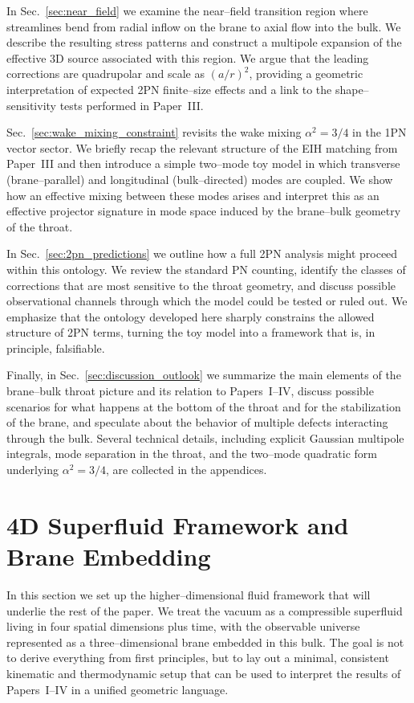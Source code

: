 \documentclass[12pt]{article}
\begin{document}
In Sec.~\ref{sec:near_field} we examine the near–field transition region
where streamlines bend from radial inflow on the brane to axial flow into
the bulk.  We describe the resulting stress patterns and construct a
multipole expansion of the effective 3D source associated with this region.
We argue that the leading corrections are quadrupolar and scale as
$(a/r)^2$, providing a geometric interpretation of expected 2PN finite–size
effects and a link to the shape–sensitivity tests performed in
Paper~III.

Sec.~\ref{sec:wake_mixing_constraint} revisits the wake mixing
$\alpha^2 = 3/4$ in the 1PN vector sector.  We briefly recap the relevant
structure of the EIH matching from Paper~III and then introduce a simple
two–mode toy model in which transverse (brane–parallel) and longitudinal
(bulk–directed) modes are coupled.  We show how an effective mixing
between these modes arises and interpret this as an effective projector
signature in mode space induced by the brane--bulk geometry of the throat.

In Sec.~\ref{sec:2pn_predictions} we outline how a full 2PN analysis might
proceed within this ontology.  We review the standard PN counting, identify
the classes of corrections that are most sensitive to the throat geometry,
and discuss possible observational channels through which the model could be
tested or ruled out.  We emphasize that the ontology developed here sharply
constrains the allowed structure of 2PN terms, turning the toy model into a
framework that is, in principle, falsifiable.

Finally, in Sec.~\ref{sec:discussion_outlook} we summarize the main elements
of the brane--bulk throat picture and its relation to Papers~I--IV, discuss
possible scenarios for what happens at the bottom of the throat and for the
stabilization of the brane, and speculate about the behavior of multiple
defects interacting through the bulk.  Several technical details, including
explicit Gaussian multipole integrals, mode separation in the throat, and
the two–mode quadratic form underlying $\alpha^2 = 3/4$, are collected in
the appendices.

\section{4D Superfluid Framework and Brane Embedding}
\label{sec:bulk_framework}

In this section we set up the higher--dimensional fluid framework that will
underlie the rest of the paper.  We treat the vacuum as a compressible
superfluid living in four spatial dimensions plus time, with the observable
universe represented as a three--dimensional brane embedded in this bulk.
The goal is not to derive everything from first principles, but to lay out a
minimal, consistent kinematic and thermodynamic setup that can be used to
interpret the results of Papers~I--IV in a unified geometric language.
\end{document}
